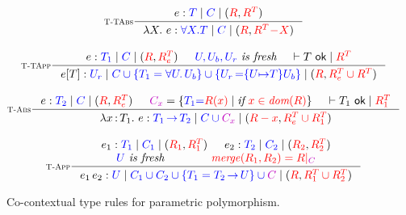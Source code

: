 \begin{figure}[t]
  \centering
  {
  \begin{gather*}
      \inference[\rulename{T-TAbs}]
        {\cojudgePol {e} {T} {C} {\reqs} {\treqs}}
        {\cojudgePol {\tabs{X}{e}} { \forall X. T} {C} {\reqs} {\treqs \!-\! X}}
\\[2ex]
      \inference[\rulename{T-TApp}]
        {\cojudgePol {e} {T_1} {C} {\reqs} {\treqs_e} &
         \fresh{U, U_b, U_r} &
         \coTypeOK{T}{\treqs}}
         {\cojudgePol {\tapp{e}{T}} {U_r} {C \cup  \{T_1 = \TUniv{U}{U_b}\} \cup \{\CSubst{U_r}{U_b}{U}{T}\}} {\reqs} {\treqs_e \cup \treqs}}
\\[2ex]
      \inference[\rulename{T-Abs}]
        {\cojudgePol {e} {T_2} {C} {\reqs} {\treqs_e} &
         \typectxcolor{C_x} = \{\typecolor{T_1} \typecolor{=} \ctxcolor{\reqs(x)} \OR \textit{if}\ \ctxcolor{x \in \dom{\reqs}}\} &
         \coTypeOK{T_1}{\treqs_1}}
        {\cojudgePol {\abs{x}{T_1}{e}} {T_1 \to T_2} {C \cup \typectxcolor{C_x}} {\reqs - x} {\treqs_e \cup \treqs_1}}
\\[2ex]
      \inference[\rulename{T-App}]
        {\cojudgePol {e_1} {T_1} {C_1} {\reqs_1} {\treqs_1} &
         \cojudgePol {e_2} {T_2} {C_2} {\reqs_2} {\treqs_2} \\
         \fresh{U} &
         \ctxcolor{\reqmerge{\reqs_1}{\reqs_2} = \reqs|_{\typectxcolor{C}}}}
        {\cojudgePol {\app{e_1}{e_2}} {U} {C_1 \cup C_2 \cup \{T_1 = T_2 \to U\} \cup \typectxcolor{C}} {\reqs} {\treqs_1 \cup \treqs_2}}
\end{gather*}
}
  \caption{Co-contextual type rules for parametric polymorphism.}
  \label{fig:co-systemf}
\end{figure}


